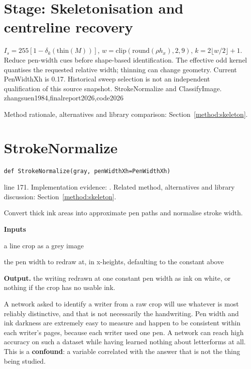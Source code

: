 \section*{Stage: Skeletonisation and centreline recovery}
{$I_s=255[1-\delta_k(\mathrm{thin}(M))]$,
$w=\mathrm{clip}(\mathrm{round}(\rho h_x),2,9)$,
$k=2\lfloor w/2\rfloor+1$.}
{Reduce pen-width cues before shape-based identification. The effective odd
kernel quantises the requested relative width; thinning can change geometry.
Current PenWidthXh is 0.17. Historical sweep selection is not an independent
qualification of this source snapshot.}
{StrokeNormalize and ClassifyImage.}
{zhangsuen1984,finalreport2026,code2026}



Method rationale, alternatives and library comparison: Section~\ref{method:skeleton}.
\section{StrokeNormalize}\label{fn:recognise:StrokeNormalize}
\begin{lstlisting}[style=sig]
def StrokeNormalize(gray, penWidthXh=PenWidthXh)
\end{lstlisting}
 line 171. Implementation evidence: \cite{code2026}. Related method, alternatives and library discussion: Section~\ref{method:skeleton}.


Convert thick ink areas into approximate pen paths and normalise stroke width.




\noindent\textbf{Inputs}
\begin{description}[leftmargin=2.2em,style=nextline,font=\normalfont\ttfamily]\setlength\itemsep{1pt}
  \item[{gray}] \normalfont a line crop as a grey image
  \item[{penWidthXh}] \normalfont the pen width to redraw at, in x-heights, defaulting to the constant above
\end{description}

\noindent\textbf{Output.} the writing redrawn at one constant pen width as ink on white, or nothing if the crop has no usable ink.


A network asked to identify a writer from a raw crop will use whatever is most reliably distinctive, and that is not necessarily the handwriting. Pen width and ink darkness are extremely easy to measure and happen to be consistent within each writer's pages, because each writer used one pen. A network can reach high accuracy on such a dataset while having learned nothing about letterforms at all. This is a \textbf{confound}: a variable correlated with the answer that is not the thing being studied.

